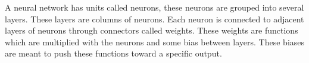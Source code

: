 A neural network has units called neurons, these neurons are grouped into several layers. These layers are columns of neurons. Each neuron is connected to adjacent layers of neurons through connectors called weights. These weights are functions which are multiplied with the neurons and some bias between layers. These biases are meant to push these functions toward a specific output.